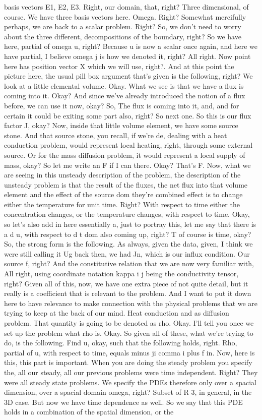 \documentclass[10pt]{article}
\begin{document}
basis vectors E1, E2, E3. Right, our domain, that, right? Three dimensional, of course. We have three basis vectors here. Omega. Right? Somewhat mercifully perhaps, we are back to a scalar problem. Right? So, we don't need to worry about the three different, decompositions of the boundary, right? So we have here, partial of omega u, right? Because u is now a scalar once again, and here we have partial, I believe omega j is how we denoted it, right? All right. Now point here has position vector X which we will use, right?. And at this point the picture here, the usual pill box argument that's given is the following, right? We look at a little elemental volume. Okay. What we see is that we have a flux is coming into it. Okay? And since we've already introduced the notion of a flux before, we can use it now, okay? So, The flux is coming into it, and, and for certain it could be exiting some part also, right? So next one. So this is our flux factor J, okay? Now, inside that little volume element, we have some source stone. And that source stone, you recall, if we're de, dealing with a heat conduction problem, would represent local heating, right, through some external source. Or for the mass diffusion problem, it would represent a local supply of mass, okay? So let me write an F if I can there. Okay? That's F. Now, what we are seeing in this unsteady description of the problem, the description of the unsteady problem is that the result of the fluxes, the net flux into that volume element and the effect of the source dom they're combined effect is to change either the temperature for unit time. Right? With respect to time either the concentration changes, or the temperature changes, with respect to time. Okay, so let's also add in here essentially a, just to portray this, let me say that there is a d u, with respect to d t dom also coming up, right? T of course is time, okay? So, the strong form is the following. As always, given the data, given, I think we were still calling it Ug back then, we had Jn, which is our influx condition. Our source f, right? And the constitutive relation that we are now very familiar with, All right, using coordinate notation kappa i j being the conductivity tensor, right? Given all of this, now, we have one extra piece of not quite detail, but it really is a coefficient that is relevant to the problem. And I want to put it down here to have relevance to make connection with the physical problems that we are trying to keep at the back of our mind. Heat conduction and as diffusion problem. That quantity is going to be denoted as rho. Okay. I'll tell you once we set up the problem what rho is. Okay. So given all of these, what we're trying to do, is the following. Find u, okay, such that the following holds, right. Rho, partial of u, with respect to time, equals minus ji comma i plus f in. Now, here is this, this part is important. When you are doing the steady problem you specify the, all our steady, all our previous problems were time independent. Right? They were all steady state problems. We specify the PDEs therefore only over a spacial dimension, over a spacial domain omega, right? Subset of R 3, in general, in the 3D case. But now we have time dependence as well. So we say that this PDE holds in a combination of the spatial dimension, or the 
\end{document}

